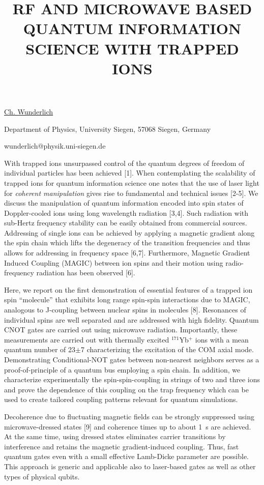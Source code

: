 \title{RF AND MICROWAVE BASED QUANTUM INFORMATION SCIENCE WITH TRAPPED IONS}

\underline{Ch. Wunderlich} 

{\normalsize{\vspace{-4mm}
Department of Physics,
University Siegen,
57068 Siegen,
Germany

\email wunderlich@physik.uni-siegen.de}}

With trapped ions unsurpassed control of the quantum degrees of freedom of individual particles has been achieved [1].  When contemplating the scalability of trapped ions for quantum information science one notes that the use of laser light for {\em coherent manipulation} gives rise to fundamental and technical issues [2-5].  We discuss the manipulation of quantum information encoded into spin states of Doppler-cooled ions using long wavelength radiation [3,4]. Such radiation with sub-Hertz frequency stability can be easily obtained from commercial sources. Addressing of single ions can be achieved by applying a magnetic gradient along the spin chain which lifts the degeneracy of the transition frequencies and thus allows for addressing in frequency space [6,7]. Furthermore,  Magnetic Gradient Induced Coupling (MAGIC) between ion spins and their motion using radio-frequency radiation has been observed [6].

Here, we report on the first demonstration of essential
features of a trapped ion spin ``molecule'' that exhibits long range spin-spin interactions due to MAGIC, analogous to J-coupling between nuclear spins in molecules [8]. Resonances of individual spins are well separated and are addressed with high fidelity. Quantum CNOT gates are carried out using microwave radiation. Importantly, these measurements are carried out with thermally excited $^{171}$Yb$^+$  ions with a mean quantum number of 23$\pm$7 characterizing the excitation of the COM axial mode. Demonstrating Conditional-NOT gates between non-nearest neighbors serves as a proof-of-principle of a quantum bus employing a spin chain. In addition, we characterize experimentally the spin-spin-coupling in strings of two and three ions and prove the dependence of this coupling on the trap frequency which can be used to create tailored coupling patterns relevant for quantum simulations.


Decoherence due to fluctuating magnetic fields can be strongly suppressed using microwave-dressed states [9] and coherence times up to about 1~s are achieved.  At the same time, using dressed  states  eliminates carrier transitions by interference and retains the magnetic gradient-induced coupling. Thus, fast quantum gates even with a small effective Lamb-Dicke parameter are possible. This approach is generic and applicable also to laser-based gates as well as other types of physical qubits.

